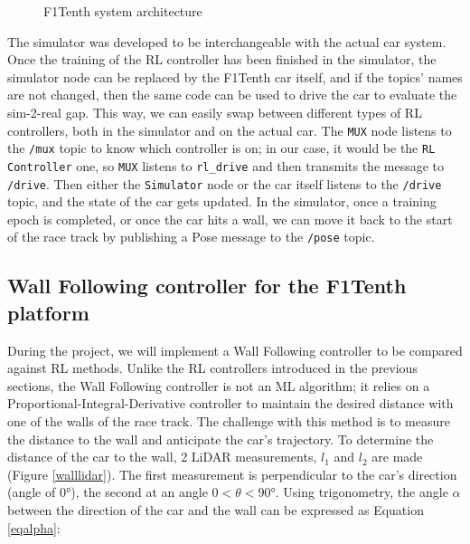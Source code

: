 \begin{figure}[H]
\caption{F1Tenth system architecture}
\label{f1tenth}
\end{figure}

The simulator was developed to be interchangeable with the actual car system. Once the training of the RL controller has been finished in the simulator, the simulator node can be replaced by the F1Tenth car itself, and if the topics' names are not changed, then the same code can be used to drive the car to evaluate the sim-2-real gap. This way, we can easily swap between different types of RL controllers, both in the simulator and on the actual car. The \verb |MUX| node listens to the \verb |/mux| topic to know which controller is on; in our case, it would be the \verb |RL Controller| one, so \verb |MUX| listens to \verb |rl_drive| and then transmits the message to \verb |/drive|. Then either the \verb |Simulator| node or the car itself listens to the \verb |/drive| topic, and the state of the car gets updated. In the simulator, once a training epoch is completed, or once the car hits a wall, we can move it back to the start of the race track by publishing a Pose message to the \verb |/pose| topic.


\subsection{Wall Following controller for the F1Tenth platform}

During the project, we will implement a Wall Following controller to be compared against RL methods. Unlike the RL controllers introduced in the previous sections, the Wall Following controller is not an ML algorithm; it relies on a Proportional-Integral-Derivative controller to maintain the desired distance with one of the walls of the race track. The challenge with this method is to measure the distance to the wall and anticipate the car's trajectory. To determine the distance of the car to the wall, 2 LiDAR measurements, $l_1$ and $l_2$ are made (Figure \ref{walllidar}). The first measurement is perpendicular to the car's direction (angle of 0°), the second at an angle $0 < \theta < 90°$. Using trigonometry, the angle $\alpha$ between the direction of the car and the wall can be expressed as Equation \ref{eqalpha}:

